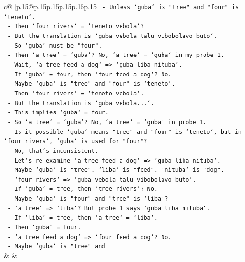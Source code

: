 \documentclass{article}
\begin{document}
{\begin{supertabular}{c@{$\;$}|p{.15\linewidth}@{}p{.15\linewidth}p{.15\linewidth}p{.15\linewidth}p{.15\linewidth}p{.15\linewidth}}
{{{\texttt{          {-} Unless `guba` is "tree" and "four" is `teneto`.} \\
\texttt{          {-} Then `four rivers` = `teneto vebola`?} \\
\texttt{          {-} But the translation is `guba vebola talu vibobolavo buto`.} \\
\texttt{          {-} So `guba` must be "four".} \\
\texttt{          {-} Then `a tree` = `guba`? No, `a tree` = `guba` in my probe 1.} \\
\texttt{          {-} Wait, `a tree feed a dog` => `guba liba nituba`.} \\
\texttt{          {-} If `guba` = four, then `four feed a dog`? No.} \\
\texttt{          {-} Maybe `guba` is "tree" and "four" is `teneto`.} \\
\texttt{          {-} Then `four rivers` = `teneto vebola`.} \\
\texttt{          {-} But the translation is `guba vebola...`.} \\
\texttt{          {-} This implies `guba` = four.} \\
\texttt{          {-} So `a tree` = `guba`? No, `a tree` = `guba` in probe 1.} \\
\texttt{          {-} Is it possible `guba` means "tree" and "four" is `teneto`, but in `four rivers`, `guba` is used for "four"?} \\
\texttt{          {-} No, that's inconsistent.} \\
\texttt{          {-} Let's re{-}examine `a tree feed a dog` => `guba liba nituba`.} \\
\texttt{          {-} Maybe `guba` is "tree". `liba` is "feed". `nituba` is "dog".} \\
\texttt{          {-} `four rivers` => `guba vebola talu vibobolavo buto`.} \\
\texttt{          {-} If `guba` = tree, then `tree rivers`? No.} \\
\texttt{          {-} Maybe `guba` is "four" and "tree" is `liba`?} \\
\texttt{          {-} `a tree` => `liba`? But probe 1 says `guba liba nituba`.} \\
\texttt{          {-} If `liba` = tree, then `a tree` = `liba`.} \\
\texttt{          {-} Then `guba` = four.} \\
\texttt{          {-} `a tree feed a dog` => `four feed a dog`? No.} \\
\texttt{          {-} Maybe `guba` is "tree" and} \\
            }
        }
    }
    & & \\ \\


\end{supertabular}}
\end{document}
